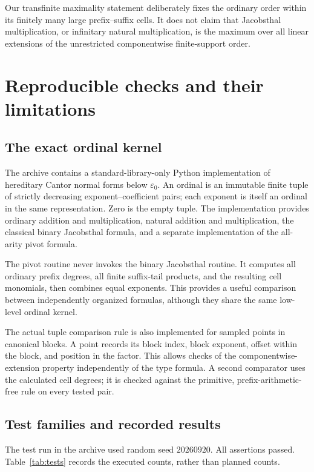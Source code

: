 \documentclass[11pt,letterpaper]{article}
\theoremstyle{definition}
\theoremstyle{remark}
\newcommand{\ep}{\varepsilon_0}
\begin{document}
Our transfinite maximality statement deliberately fixes the ordinary
order within its finitely many large prefix--suffix cells. It does not
claim that Jacobsthal multiplication, or infinitary natural multiplication,
is the maximum over all linear extensions of the unrestricted componentwise
finite-support order.

\section{Reproducible checks and their limitations}\label{sec:checks}

\subsection{The exact ordinal kernel}

The archive contains a standard-library-only Python implementation of
hereditary Cantor normal forms below $\ep$. An ordinal is an immutable
finite tuple of strictly decreasing exponent--coefficient pairs; each
exponent is itself an ordinal in the same representation. Zero is the
empty tuple. The implementation provides ordinary addition and
multiplication, natural addition and multiplication, the classical binary
Jacobsthal formula, and a separate implementation of the all-arity pivot
formula.

The pivot routine never invokes the binary Jacobsthal routine. It computes
all ordinary prefix degrees, all finite suffix-tail products, and the
resulting cell monomials, then combines equal exponents. This provides a
useful comparison between independently organized formulas, although they
share the same low-level ordinal kernel.

The actual tuple comparison rule is also implemented for sampled points
in canonical blocks. A point records its block index, block exponent,
offset within the block, and position in the factor. This allows checks
of the componentwise-extension property independently of the type formula.
A second comparator uses the calculated cell degrees; it is checked
against the primitive, prefix-arithmetic-free rule on every tested pair.

\subsection{Test families and recorded results}

The test run in the archive used random seed $20260920$. All assertions
passed. Table~\ref{tab:tests} records the executed counts, rather than
planned counts.
\end{document}

